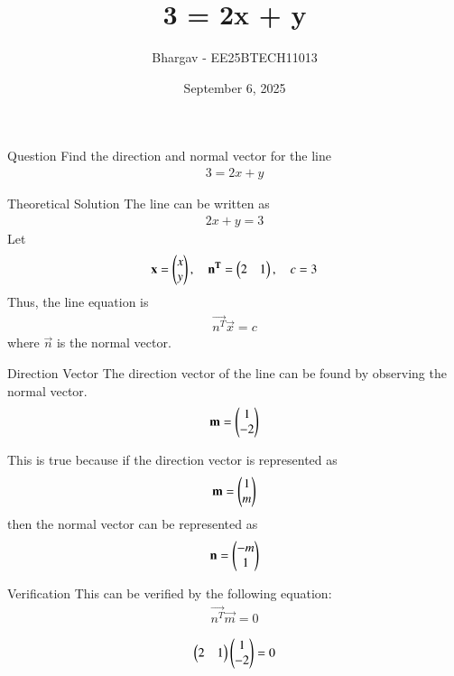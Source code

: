 \documentclass{beamer}
\title %
{3 = 2x + y}
\date{September 6, 2025}
\author %
{Bhargav - EE25BTECH11013}
\begin{document}
\frame{\titlepage}

\begin{frame}{Question}
Find the direction and normal vector for the line 
\begin{align}
    3 = 2x + y
\end{align}
\end{frame}

\begin{frame}{Theoretical Solution}
The line can be written as
\begin{align}
    2x + y = 3
\end{align}
Let
\begin{align}
    \mathbf{x} = \begin{pmatrix}x \\ y\end{pmatrix}, \quad
    \mathbf{n^T} = \begin{pmatrix}2 & 1\end{pmatrix}, \quad
    c = 3
\end{align}
Thus, the line equation is
\begin{align}
    \vec{n^T}\vec{x} = c
\end{align}
where $\vec{n}$ is the normal vector.
\end{frame}

\begin{frame}{Direction Vector}
The direction vector of the line can be found by observing the normal vector.
\begin{align}
\mathbf{m} = \begin{pmatrix}1 \\ -2\end{pmatrix}
\end{align}

This is true because if the direction vector is represented as 
\begin{align}
\mathbf{m}  = \begin{pmatrix}1 \\ m\end{pmatrix}    
\end{align}
then the normal vector can be represented as 
\begin{align}
\mathbf{n} = \begin{pmatrix}-m \\ 1\end{pmatrix}
\end{align}
\end{frame}

\begin{frame}{Verification}
This can be verified by the following equation:
\begin{align}
\vec{n^T}\vec{m} = 0
\end{align}

\begin{align}
\begin{pmatrix}2 & 1\end{pmatrix}\begin{pmatrix}1 \\ -2\end{pmatrix} = 0
\end{align}\\    
\end{frame}
\end{document}
